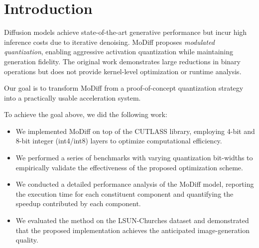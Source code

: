 \section{Introduction}

Diffusion models achieve state-of-the-art generative performance but incur high inference costs due to iterative denoising.
MoDiff proposes \emph{modulated quantization}, enabling aggressive activation quantization while maintaining generation fidelity. The original work demonstrates large reductions in binary operations but does not provide kernel-level optimization or runtime analysis.

Our goal is to transform MoDiff from a proof-of-concept quantization strategy into a practically usable acceleration system.

To achieve the goal above, we did the following work:
\begin{itemize}
    \item We implemented MoDiff on top of the CUTLASS library, employing 4-bit and 8-bit integer (int4/int8) layers to optimize computational efficiency.
    \item We performed a series of benchmarks with varying quantization bit-widths to empirically validate the effectiveness of the proposed optimization scheme.
    \item We conducted a detailed performance analysis of the MoDiff model, reporting the execution time for each constituent component and quantifying the speedup contributed by each component.
    \item We evaluated the method on the LSUN-Churches dataset and demonstrated that the proposed implementation achieves the anticipated image-generation quality.
\end{itemize}
